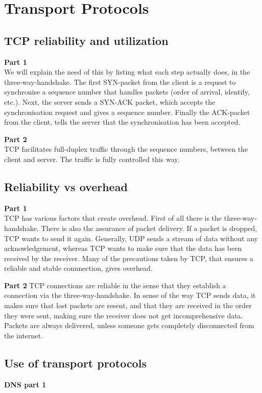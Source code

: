 \section{Transport Protocols}
\subsection{TCP reliability and utilization}
\textbf{Part 1} \\
We will explain the need of this by listing what each step actually does, in the
three-way-handshake. The first SYN-packet from the client is a request to
synchronise a sequence number that handles packets (order of arrival, identify,
etc.). Next, the server sends a SYN-ACK packet, which accepts the synchronisation
request and gives a sequence number. Finally the ACK-packet from the client,
tells the server that the synchronisation has been accepted.

\noindent \textbf{Part 2} \\
TCP facilitates full-duplex traffic through the sequence numbers, between the
client and server. The traffic is fully controlled this way.

\subsection{Reliability vs overhead}
\textbf{Part 1} \\
TCP has various factors that create overhead. First of all there is the
three-way-handshake. There is also the assurance of packet delivery. If a
packet is dropped, TCP wants to send it again. Generally, UDP sends a stream of
data without any acknowledgement, whereas TCP wants to make sure that the data
has been received by the receiver. Many of the precautions taken by TCP, that
ensures a reliable and stable connnection, gives overhead.

\noindent \textbf{Part 2}
TCP connections are reliable in the sense that they establish a connection via
the three-way-handshake. In sense of the way TCP sends data, it makes sure that
lost packets are resent, and that they are received in the order they were sent,
making sure the receiver does not get incomprehensive data. Packets are always
delivered, unless someone gets completely disconnected from the internet.

\subsection{Use of transport protocols}
\textbf{DNS part 1} \\

